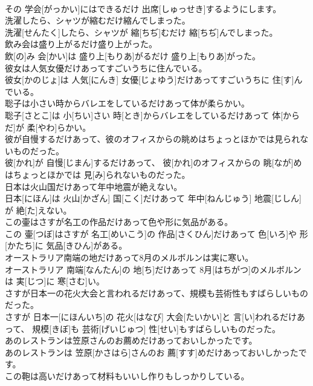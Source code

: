 \documentclass[8pt]{extreport}
\begin{document}
\begin{CJK}{UTF8}{min}
\\	その 学会[がっかい]にはできるだけ 出席[しゅっせき]するようにします。
\\	洗濯したら、シャツが縮むだけ縮んでしまった。	
\\	洗濯[せんたく]したら、シャツが 縮[ちぢ]むだけ 縮[ちぢ]んでしまった。
\\	飲み会は盛り上がるだけ盛り上がった。	
\\	飲[の]み 会[かい]は 盛り上[もりあ]がるだけ 盛り上[もりあ]がった。
\\	彼女は人気女優だけあってすごいうちに住んでいる。	
\\	彼女[かのじょ]は 人気[にんき] 女優[じょゆう]だけあってすごいうちに 住[す]んでいる。
\\	聡子は小さい時からバレエをしているだけあって体が柔らかい。	
\\	聡子[さとこ]は 小[ちい]さい 時[とき]からバレエをしているだけあって 体[からだ]が 柔[やわ]らかい。
\\	彼が自慢するだけあって、彼のオフィスからの眺めはちょっとほかでは見られないものだった。	
\\	彼[かれ]が 自慢[じまん]するだけあって、 彼[かれ]のオフィスからの 眺[なが]めはちょっとほかでは 見[み]られないものだった。
\\	日本は火山国だけあって年中地震が絶えない。	
\\	日本[にほん]は 火山[かざん] 国[こく]だけあって 年中[ねんじゅう] 地震[じしん]が 絶[た]えない。
\\	この壷はさすが名工の作品だけあって色や形に気品がある。	
\\	この 壷[つぼ]はさすが 名工[めいこう]の 作品[さくひん]だけあって 色[いろ]や 形[かたち]に 気品[きひん]がある。
\\	オーストラリア南端の地だけあって8月のメルボルンは実に寒い。	
\\	オーストラリア 南端[なんたん]の 地[ち]だけあって 8月[はちがつ]のメルボルンは 実[じつ]に 寒[さむ]い。
\\	さすが日本一の花火大会と言われるだけあって、規模も芸術性もすばらしいものだった。	
\\	さすが 日本一[にほんいち]の 花火[はなび] 大会[たいかい]と 言[い]われるだけあって、 規模[きぼ]も 芸術[げいじゅつ] 性[せい]もすばらしいものだった。
\\	あのレストランは笠原さんのお薦めだけあっておいしかったです。	
\\	あのレストランは 笠原[かさはら]さんのお 薦[すす]めだけあっておいしかったです。
\\	この鞄は高いだけあって材料もいいし作りもしっかりしている。	

\end{CJK}
\end{document}
